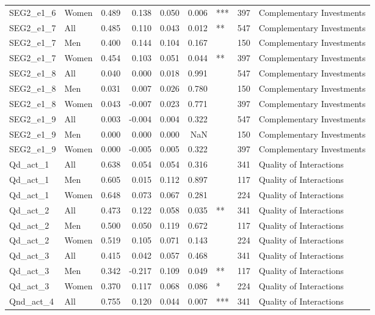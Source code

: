 \begin{table}
\begin{tabular}[t]{llrrrrlrl}
SEG2\_e1\_6 & Women & 0.489 & 0.138 & 0.050 & 0.006 & *** & 397 & Complementary Investments\\
SEG2\_e1\_7 & All & 0.485 & 0.110 & 0.043 & 0.012 & ** & 547 & Complementary Investments\\
SEG2\_e1\_7 & Men & 0.400 & 0.144 & 0.104 & 0.167 &  & 150 & Complementary Investments\\
\addlinespace
SEG2\_e1\_7 & Women & 0.454 & 0.103 & 0.051 & 0.044 & ** & 397 & Complementary Investments\\
SEG2\_e1\_8 & All & 0.040 & 0.000 & 0.018 & 0.991 &  & 547 & Complementary Investments\\
SEG2\_e1\_8 & Men & 0.031 & 0.007 & 0.026 & 0.780 &  & 150 & Complementary Investments\\
SEG2\_e1\_8 & Women & 0.043 & -0.007 & 0.023 & 0.771 &  & 397 & Complementary Investments\\
SEG2\_e1\_9 & All & 0.003 & -0.004 & 0.004 & 0.322 &  & 547 & Complementary Investments\\
\addlinespace
SEG2\_e1\_9 & Men & 0.000 & 0.000 & 0.000 & NaN &  & 150 & Complementary Investments\\
SEG2\_e1\_9 & Women & 0.000 & -0.005 & 0.005 & 0.322 &  & 397 & Complementary Investments\\
Qd\_act\_1 & All & 0.638 & 0.054 & 0.054 & 0.316 &  & 341 & Quality of Interactions\\
Qd\_act\_1 & Men & 0.605 & 0.015 & 0.112 & 0.897 &  & 117 & Quality of Interactions\\
Qd\_act\_1 & Women & 0.648 & 0.073 & 0.067 & 0.281 &  & 224 & Quality of Interactions\\
\addlinespace
Qd\_act\_2 & All & 0.473 & 0.122 & 0.058 & 0.035 & ** & 341 & Quality of Interactions\\
Qd\_act\_2 & Men & 0.500 & 0.050 & 0.119 & 0.672 &  & 117 & Quality of Interactions\\
Qd\_act\_2 & Women & 0.519 & 0.105 & 0.071 & 0.143 &  & 224 & Quality of Interactions\\
Qd\_act\_3 & All & 0.415 & 0.042 & 0.057 & 0.468 &  & 341 & Quality of Interactions\\
Qd\_act\_3 & Men & 0.342 & -0.217 & 0.109 & 0.049 & ** & 117 & Quality of Interactions\\
\addlinespace
Qd\_act\_3 & Women & 0.370 & 0.117 & 0.068 & 0.086 & * & 224 & Quality of Interactions\\
Qnd\_act\_4 & All & 0.755 & 0.120 & 0.044 & 0.007 & *** & 341 & Quality of Interactions\\

\end{tabular}
\end{table}
